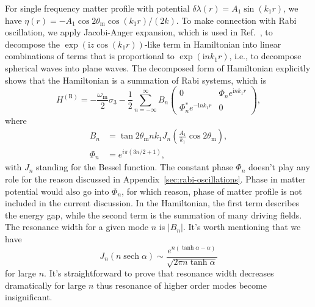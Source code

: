 \documentclass[%
reprint,
 amsmath,amssymb,
 prd,
]{revtex4-1}
\newcommand{\sech}[1]{{\operatorname{sech}{#1}}}
\newcommand{\ri}{\mathrm{i}}
\begin{document}
For single frequency matter profile with potential $\delta\lambda(r) = A_1\sin(k_1 r)$, we have $\eta(r) = - A_1 \cos 2\theta_{\mathrm m} \cos (k_1 r)/(2 k) $. To make connection with Rabi oscillation, we apply Jacobi-Anger expansion, which is used in Ref.~, to decompose the $\exp\left( \ri z \cos\left(k_1 r \right) \right)$-like term in Hamiltonian into linear combinations of terms that is proportional to $\exp\left(\ri n k_1 r \right)$, i.e., to decompose spherical waves into plane waves. The decomposed form of Hamiltonian explicitly shows that the Hamiltonian is a summation of Rabi systems, which is
\begin{equation*}
    H^{(\mathrm{R})} =
    -\frac{\omega_{\mathrm{m}}}{2} \sigma_3
    -  \frac{1}{2} \sum_{n=-\infty}^\infty B_n \begin{pmatrix}
    0 &  \Phi_n e^{\ri n k_1  r} \\
     \Phi_n^* e^{ - \ri n k_1 r} & 0
    \end{pmatrix},
\end{equation*}
where
\begin{align*}
    B_n &= \tan 2\theta_{\mathrm m} n k_1 J_{n} \left( \frac{A_1}{k_1}\cos 2\theta_{\mathrm m} \right),\\
    \Phi_n &= e^{i\pi (3n/2+1)},
\end{align*}
with $J_n$ standing for the Bessel function.
The constant phase $\Phi_n$ doesn't play any role for the reason discussed in Appendix~\ref{sec:rabi-oscillations}. Phase in matter potential would also go into $\Phi_n$, for which reason, phase of matter profile is not included in the current discussion. In the Hamiltonian, the first term describes the energy gap, while the second term is the summation of many driving fields. The resonance width for a given mode $n$ is $\lvert B_{n}\rvert$. It's worth mentioning that we have~\cite{Ploumistakis20092897}
\begin{equation}
J_n(n \sech \alpha) \sim \frac{ e^{n(\tanh\alpha - \alpha)} }{\sqrt{ 2\pi n \tanh \alpha } }
\end{equation}
for large $n$. It's straightforward to prove that resonance width decreases dramatically for large $n$ thus resonance of higher order modes become insignificant.
\end{document}
